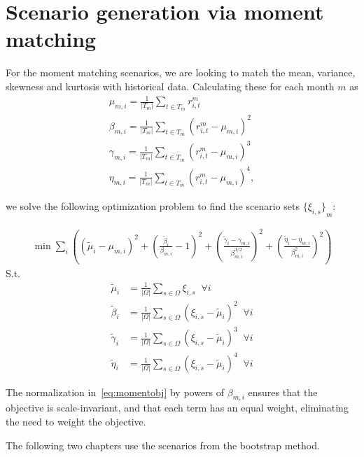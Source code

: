 \section{Scenario generation via moment matching}

For the moment matching scenarios, we are looking to match the mean, variance, skewness and kurtosis with historical data.
Calculating these for each month $m$ as
\begin{gather}
\mu_{m,i} = \frac{1}{|T_m|} \sum_{t \in T_m} r^m_{i,t} \\
\beta_{m,i} = \frac{1}{|T_m|} \sum_{t \in T_m} {\left( r^m_{i,t} - \mu_{m,i} \right)}^2 \\
\gamma_{m,i} = \frac{1}{|T_m|} \sum_{t \in T_m} {\left( r^m_{i,t} - \mu_{m,i} \right)}^3 \\
\eta_{m,i} = \frac{1}{|T_m|} \sum_{t \in T_m} {\left( r^m_{i,t} - \mu_{m,i} \right)}^4 ,
\end{gather}

we solve the following optimization problem to find the scenario sets ${\{\xi_{i,s}\}}_{m}$:

\begin{align}
\min \sum_i \left(
	{(\tilde{\mu}_i - \mu_{m,i})}^2 +
	{\left( \frac{\tilde{\beta}_i}{\beta_{m,i}} - 1 \right)}^2 +
	{\left( \frac{\tilde{\gamma}_i - \gamma_{m,i}}{\beta_{m,i}^{3/2}} \right)}^2 +
	{\left( \frac{\tilde{\eta}_i - \eta_{m,i}}{\beta_{m,i}^{2}} \right)}^2
\right)
\label{eq:momentobj}
\end{align}
S.t.
\begin{align}
\tilde{\mu}_i &= \frac{1}{|\Omega|} \sum_{s \in \Omega} \xi_{i,s} \; \; \forall i \\
\tilde{\beta}_i &= \frac{1}{|\Omega|} \sum_{s \in \Omega} {\left( \xi_{i,s} - \tilde{\mu}_i \right)}^2 \; \; \forall i \\
\tilde{\gamma}_i &= \frac{1}{|\Omega|} \sum_{s \in \Omega} {\left( \xi_{i,s} - \tilde{\mu}_i \right)}^3 \; \; \forall i \\
\tilde{\eta}_i &= \frac{1}{|\Omega|} \sum_{s \in \Omega} {\left( \xi_{i,s} - \tilde{\mu}_i \right)}^4 \; \; \forall i
\end{align}

The normalization in~\eqref{eq:momentobj} by powers of $\beta_{m,i}$ ensures that the objective is scale-invariant, and that each term has an equal weight, eliminating the need to weight the objective.

The following two chapters use the scenarios from the bootstrap method.
